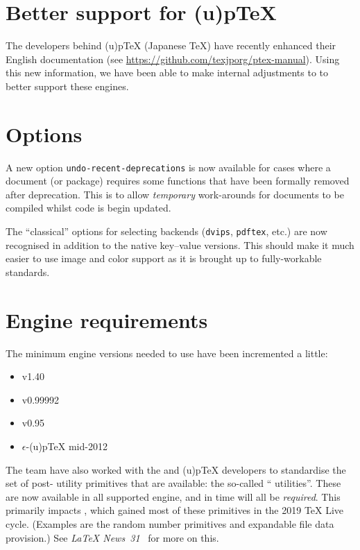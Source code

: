 \documentclass{ltnews}
\begin{document}
\section{Better support for (u)p\TeX{}}

The developers behind (u)p\TeX{} (Japanese \TeX{}) have recently enhanced their
English documentation (see \url{https://github.com/texjporg/ptex-manual}).
Using this new information, we have been able to make internal adjustments to
 to better support these engines.

\section{Options}

A new option \texttt{undo-recent-deprecations} is now available for cases where
a document (or package) requires some  functions that have been
formally removed after deprecation. This is to allow \emph{temporary}
work-arounds for documents to be compiled whilst code is begin updated.

The \enquote{classical} options for selecting backends (\texttt{dvips},
\texttt{pdftex}, etc.) are now recognised in addition to the native key--value
versions. This should make it much easier to use  image and color
support as it is brought up to fully-workable standards.

\section{Engine requirements}

The minimum engine versions needed to use  have been
incremented a little:
\begin{itemize}
  \item {} v1.40
  \item {} v0.99992
  \item {} v0.95
  \item $\epsilon$-(u)p\TeX{} mid-2012
\end{itemize}

The team have also worked with the  and (u)p\TeX{} developers to
standardise the set of post-\eTeX{} utility primitives that are available: the
so-called \enquote{ utilities}. These are now available in all
supported engine, and in time will all be \emph{required}. This primarily
impacts , which gained most of these primitives in the 2019
\TeX{} Live cycle. (Examples are the random number primitives and expandable
file data provision.) See \emph{\LaTeX{} News~31}~\cite{12:site-news} for more on this.
\end{document}
